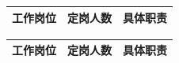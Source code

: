 \documentclass[a4paper]{article}
\begin{document}
\begin{tabular}{|c|c|c|}
\hline
工作岗位 & 定岗人数 & 具体职责 \\
\hline
%
\end{tabular}

\vspace{1cm}

\begin{tabular}{|c|c|c|}
\hline
工作岗位 & 定岗人数 & 具体职责 \\
\hline

\end{tabular}
\end{document}
